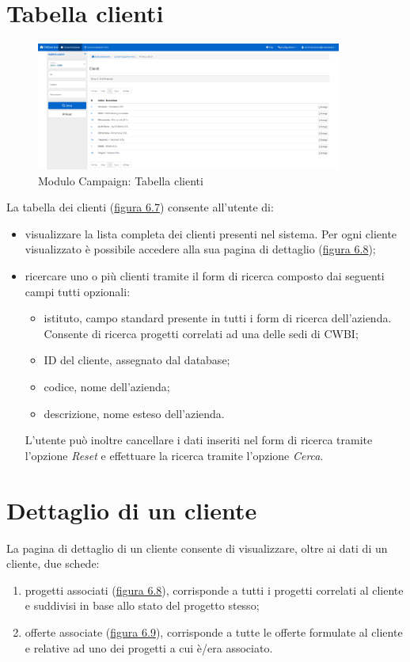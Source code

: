 \pagebreak

\section{Tabella clienti}
\begin{figure}[!h]
\centering
\includegraphics[width=380px]{../images/UI/08-tabellaClienti.png}
\caption{Modulo Campaign: Tabella clienti}
\label{fig:tabellaClienti}
\end{figure}

\noindent La tabella dei clienti ({\hyperref[fig:tabellaClienti]{figura 6.7}}) consente all'utente di:
\begin{itemize}
\item visualizzare la lista completa dei clienti presenti nel sistema. Per ogni cliente visualizzato è possibile accedere alla sua pagina di dettaglio ({\hyperref[fig:dettaglioCliente1]{figura 6.8}}); 
\item ricercare uno o più clienti tramite il form di ricerca composto dai seguenti campi tutti opzionali:
\begin{itemize}
\item istituto, campo standard presente in tutti i form di ricerca dell'azienda. Consente di ricerca progetti correlati ad una delle sedi di CWBI;
\item ID del cliente, assegnato dal database;
\item codice, nome dell'azienda;
\item descrizione, nome esteso dell'azienda.
\end{itemize}
L'utente può inoltre cancellare i dati inseriti nel form di ricerca tramite l'opzione \textit{Reset} e effettuare la ricerca tramite l'opzione \textit{Cerca}.
\end{itemize}

\pagebreak

\section{Dettaglio di un cliente}
\noindent La pagina di dettaglio di un cliente consente di visualizzare, oltre ai dati di un cliente, due schede:
\begin{enumerate}
\item progetti associati ({\hyperref[fig:dettaglioCliente1]{figura 6.8}}), corrisponde a tutti i progetti correlati al cliente e suddivisi in base allo stato del progetto stesso;
\item offerte associate ({\hyperref[fig:dettaglioCliente2]{figura 6.9}}), corrisponde a tutte le offerte formulate al cliente e relative ad uno dei progetti a cui è/era associato.
\end{enumerate}


